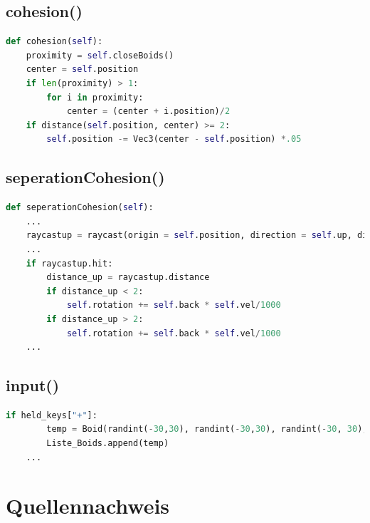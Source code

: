 \documentclass[a4paper, hidelinks, 12pt]{article}
\begin{document}
\subsection{cohesion()}\label{Codecohesion}
\begin{lstlisting}[style=mystyle, language=Python]
def cohesion(self):
	proximity = self.closeBoids()
	center = self.position
	if len(proximity) > 1:
		for i in proximity:
			center = (center + i.position)/2
	if distance(self.position, center) >= 2:
		self.position -= Vec3(center - self.position) *.05
\end{lstlisting}
\subsection{seperationCohesion()}\label{CodeseperationCohesion}
\begin{lstlisting}[style=mystyle, language=Python]
def seperationCohesion(self):
	...
	raycastup = raycast(origin = self.position, direction = self.up, distance = 5, traverse_target = scene, ignore = (Wireframe,))
	...
	if raycastup.hit:
		distance_up = raycastup.distance
		if distance_up < 2:
			self.rotation += self.back * self.vel/1000
		if distance_up > 2:
			self.rotation += self.back * self.vel/1000
	...
\end{lstlisting}
\newpage
\subsection{input()}\label{Codeinput}
\begin{lstlisting}[style=mystyle, language=Python]
	if held_keys["+"]:
		temp = Boid(randint(-30,30), randint(-30,30), randint(-30, 30), randint(0,360), randint(0,360), randint(0,360), uniform(50.0, 300.0), uniform(0.0, 10.0), 300.0, 1, groesse)
		Liste_Boids.append(temp)
	...
\end{lstlisting}
\newpage

\section{Quellennachweis}
\scriptsize
\newpage
\end{document}
